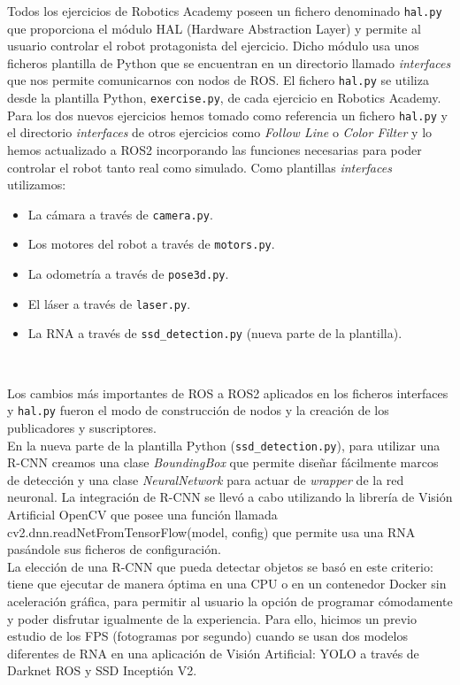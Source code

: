 Todos los ejercicios de Robotics Academy poseen un fichero denominado \texttt{hal.py} que proporciona el módulo HAL (Hardware Abstraction Layer) y permite al usuario controlar el robot protagonista del ejercicio. Dicho módulo usa unos ficheros plantilla de Python que se encuentran en un directorio llamado \textit{interfaces} que nos permite comunicarnos con nodos de ROS. El fichero \texttt{hal.py} se utiliza desde la plantilla Python, \texttt{exercise.py}, de cada ejercicio en Robotics Academy.\\

Para los dos nuevos ejercicios hemos tomado como referencia un fichero \texttt{hal.py} y el directorio \textit{interfaces} de otros ejercicios como \textit{Follow Line} o \textit{Color Filter} y lo hemos actualizado a ROS2 incorporando las funciones necesarias para poder controlar el robot tanto real como simulado. Como plantillas \textit{interfaces} utilizamos:

\begin{itemize}
	\item La cámara a través de \texttt{camera.py}.
	\item Los motores del robot a través de \texttt{motors.py}.
	\item La odometría a través de \texttt{pose3d.py}.
	\item El láser a través de \texttt{laser.py}.
	\item La RNA a través de \texttt{ssd\_detection.py} (nueva parte de la plantilla).
\end{itemize}\

Los cambios más importantes de ROS a ROS2 aplicados en los ficheros interfaces y \texttt{hal.py} fueron el modo de construcción de nodos y la creación de los publicadores y suscriptores.\\

En la nueva parte de la plantilla Python (\texttt{ssd\_detection.py}), para utilizar una R-CNN creamos una clase \textit{BoundingBox} que permite diseñar fácilmente marcos de detección y una clase \textit{NeuralNetwork} para actuar de \textit{wrapper} de la red neuronal. La integración de R-CNN se llevó a cabo utilizando la librería de Visión Artificial OpenCV que posee una función llamada cv2.dnn.readNetFromTensorFlow(model, config) que permite usa una RNA pasándole sus ficheros de configuración.\\

La elección de una R-CNN que pueda detectar objetos se basó en este criterio: tiene que ejecutar de manera óptima en una CPU o en un contenedor Docker sin aceleración gráfica, para permitir al usuario la opción de programar cómodamente y poder disfrutar igualmente de la experiencia. Para ello, hicimos un previo estudio de los FPS (fotogramas por segundo) cuando se usan dos modelos diferentes de RNA en una aplicación de Visión Artificial: YOLO a través de Darknet ROS y SSD Inceptión V2.


